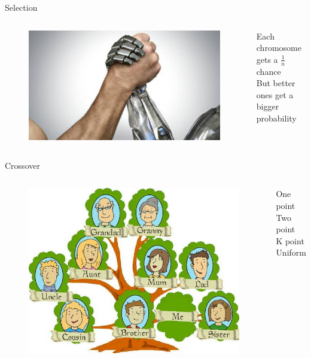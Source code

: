 \documentclass[18pt]{beamer}
\begin{document}
    \begin{frame}{Selection}
        \begin{columns}
                \begin{figure}
                \includegraphics[scale=0.25]{humanvsrobot}
                \end{figure}
                Each chromosome gets a $ \frac{1}{n} $ chance\\
                But better ones get a bigger probability
        \end{columns}
    \end{frame}

    \begin{frame}{Crossover}
        \begin{columns}
                \begin{figure}
                \includegraphics[scale=0.3]{family}
                \end{figure}
                One point\\
                Two point\\
                K point\\
                Uniform
        \end{columns}
    \end{frame}
\end{document}
